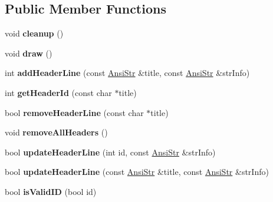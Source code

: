 \subsection*{Public Member Functions}
\begin{DoxyCompactItemize}
\item 
\hypertarget{classps_1_1scene_1_1SGHeaders_a6dcebb075fefd4209dd6b059a543cb4f}{}void {\bfseries cleanup} ()\label{classps_1_1scene_1_1SGHeaders_a6dcebb075fefd4209dd6b059a543cb4f}

\item 
\hypertarget{classps_1_1scene_1_1SGHeaders_ac39e5dab01a381280d214b717bcb8b46}{}void {\bfseries draw} ()\label{classps_1_1scene_1_1SGHeaders_ac39e5dab01a381280d214b717bcb8b46}

\item 
\hypertarget{classps_1_1scene_1_1SGHeaders_ad362df2d7ee0e2cf20da258a3e69001c}{}int {\bfseries add\+Header\+Line} (const \hyperlink{classps_1_1base_1_1CAString}{Ansi\+Str} \&title, const \hyperlink{classps_1_1base_1_1CAString}{Ansi\+Str} \&str\+Info)\label{classps_1_1scene_1_1SGHeaders_ad362df2d7ee0e2cf20da258a3e69001c}

\item 
\hypertarget{classps_1_1scene_1_1SGHeaders_a51e502325499e2e4d413738c49c44b20}{}int {\bfseries get\+Header\+Id} (const char $\ast$title)\label{classps_1_1scene_1_1SGHeaders_a51e502325499e2e4d413738c49c44b20}

\item 
\hypertarget{classps_1_1scene_1_1SGHeaders_a433dc5477dc75f2028705c4d9029157c}{}bool {\bfseries remove\+Header\+Line} (const char $\ast$title)\label{classps_1_1scene_1_1SGHeaders_a433dc5477dc75f2028705c4d9029157c}

\item 
\hypertarget{classps_1_1scene_1_1SGHeaders_ad6c9f0fc6527becb9129d8623e4539bd}{}void {\bfseries remove\+All\+Headers} ()\label{classps_1_1scene_1_1SGHeaders_ad6c9f0fc6527becb9129d8623e4539bd}

\item 
\hypertarget{classps_1_1scene_1_1SGHeaders_a4320104f16e3c04228ce57fd5a76cf25}{}bool {\bfseries update\+Header\+Line} (int id, const \hyperlink{classps_1_1base_1_1CAString}{Ansi\+Str} \&str\+Info)\label{classps_1_1scene_1_1SGHeaders_a4320104f16e3c04228ce57fd5a76cf25}

\item 
\hypertarget{classps_1_1scene_1_1SGHeaders_a5eda7e8c04676c5b1cff7fbef3fc35e0}{}bool {\bfseries update\+Header\+Line} (const \hyperlink{classps_1_1base_1_1CAString}{Ansi\+Str} \&title, const \hyperlink{classps_1_1base_1_1CAString}{Ansi\+Str} \&str\+Info)\label{classps_1_1scene_1_1SGHeaders_a5eda7e8c04676c5b1cff7fbef3fc35e0}

\item 
\hypertarget{classps_1_1scene_1_1SGHeaders_a61ad34f586ce5b5522fdc2beda11c6a3}{}bool {\bfseries is\+Valid\+I\+D} (bool id)\label{classps_1_1scene_1_1SGHeaders_a61ad34f586ce5b5522fdc2beda11c6a3}

\end{DoxyCompactItemize}
